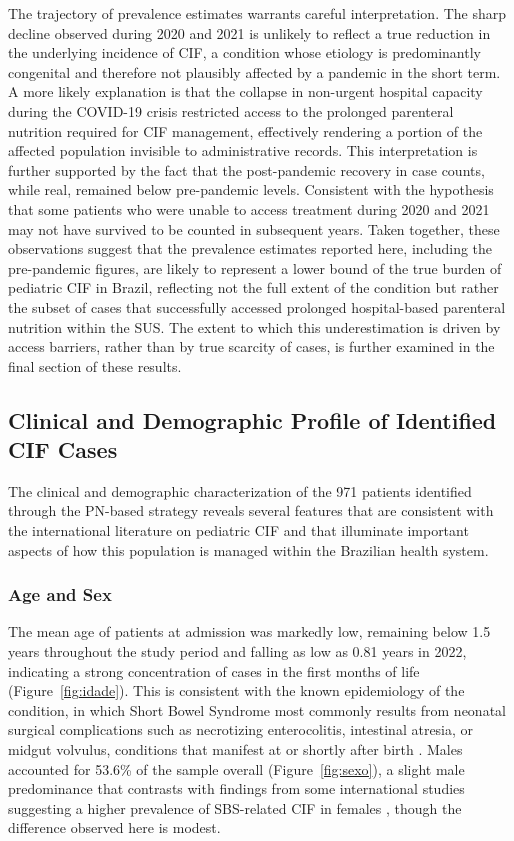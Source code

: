 \documentclass[12pt,a4paper]{article}
\theoremstyle{plain}
\theoremstyle{definition}
\theoremstyle{remark}
\begin{document}
The trajectory of prevalence estimates warrants careful interpretation. The sharp decline observed during 2020 and 2021 is unlikely to reflect a true reduction in the underlying incidence of CIF, a condition whose etiology is predominantly congenital and therefore not plausibly affected by a pandemic in the short term. A more likely explanation is that the collapse in non-urgent hospital capacity during the COVID-19 crisis restricted access to the prolonged parenteral nutrition required for CIF management, effectively rendering a portion of the affected population invisible to administrative records. This interpretation is further supported by the fact that the post-pandemic recovery in case counts, while real, remained below pre-pandemic levels. Consistent with the hypothesis that some patients who were unable to access treatment during 2020 and 2021 may not have survived to be counted in subsequent years. Taken together, these observations suggest that the prevalence estimates reported here, including the pre-pandemic figures, are likely to represent a lower bound of the true burden of pediatric CIF in Brazil, reflecting not the full extent of the condition but rather the subset of cases that successfully accessed prolonged hospital-based parenteral nutrition within the SUS. The extent to which this underestimation is driven by access barriers, rather than by true scarcity of cases, is further examined in the final section of these results.

\subsection*{Clinical and Demographic Profile of Identified CIF Cases}

The clinical and demographic characterization of the 971 patients identified through the PN-based strategy reveals several features that are consistent with the international literature on pediatric CIF and that illuminate important aspects of how this population is managed within the Brazilian health system.

\subsubsection*{Age and Sex}

The mean age of patients at admission was markedly low, remaining below 1.5 years throughout the study period and falling as low as 0.81 years in 2022, indicating a strong concentration of cases in the first months of life (Figure~\ref{fig:idade}). This is consistent with the known epidemiology of the condition, in which Short Bowel Syndrome most commonly results from neonatal surgical complications such as necrotizing enterocolitis, intestinal atresia, or midgut volvulus, conditions that manifest at or shortly after birth \cite{wales2004neonatal, squires2012natural}. Males accounted for 53.6\% of the sample overall (Figure~\ref{fig:sexo}), a slight male predominance that contrasts with findings from some international studies suggesting a higher prevalence of SBS-related CIF in females \cite{massironi2020understanding}, though the difference observed here is modest.
\end{document}
